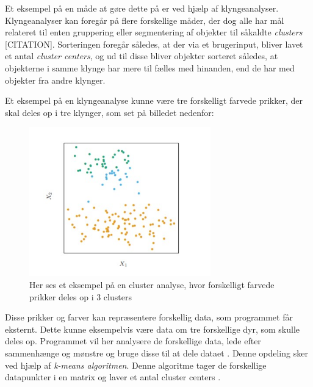 Et eksempel på en måde at gøre dette på er ved hjælp af klyngeanalyser. Klyngeanalyser kan foregår på flere forskellige måder, der dog alle har mål relateret til enten gruppering eller segmentering af objekter til såkaldte \textit{clusters} [CITATION]. Sorteringen foregår således, at der via et brugerinput, bliver lavet et antal \textit{cluster centers}, og ud til disse bliver objekter sorteret således, at objekterne i samme klynge har mere til fælles med hinanden, end de har med objekter fra andre klynger.
\par
Et eksempel på en klyngeanalyse kunne være tre forskelligt farvede prikker, der skal deles op i tre klynger, som set på billedet nedenfor:
\begin{figure}[H]
    \centering
    \includegraphics[width=0.7\textwidth]{figures/Cluster.jpg}
    \caption{Her ses et eksempel på en cluster analyse, hvor forskelligt farvede prikker deles op i 3 clusters \cite{Rodriguez-Perez1994}}
    \label{ClusterEksempel}
\end{figure}
Disse prikker og farver kan repræsentere forskellig data, som programmet får eksternt. Dette kunne eksempelvis være data om tre forskellige dyr, som skulle deles op. Programmet vil her analysere de forskellige data, lede efter sammenhænge og mønstre og bruge disse til at dele dataet \cite{Rodriguez-Perez1994}. Denne opdeling sker ved hjælp af \textit{k-means algoritmen}. Denne algoritme tager de forskellige datapunkter i en matrix og laver et antal cluster centers \cite{K-Means}.
\par

